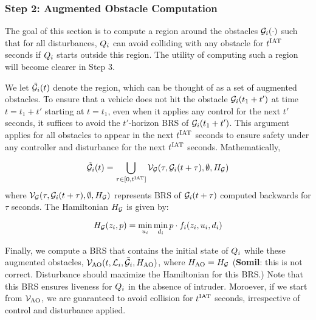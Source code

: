 \subsubsection{Step 2: Augmented Obstacle Computation \label{sec:intruder_aocomp}}
The goal of this section is to compute a region around the obstacles $\mathcal{G}_i(\cdot)$ such that for all disturbances, $Q_{i}$ can avoid colliding with any obstacle for $t^\text{IAT}$ seconds if $Q_{i}$ starts outside this region. The utility of computing such a region will become clearer in Step 3. 

We let $\tilde{\mathcal{G}}_i(t)$ denote the region, which can be thought of as a set of augmented obstacles. To ensure that a vehicle does not hit the obstacle $\mathcal{G}_i(t_1 + t')$ at time $t = t_1 + t'$ starting at $t = t_1$, even when it applies any control for the next $t'$ seconds, it suffices to avoid the $t'$-horizon BRS of $\mathcal{G}_i(t_1 + t')$. This argument applies for all obstacles to appear in the next $t^\text{IAT}$ seconds to ensure safety under any controller and disturbance for the next $t^\text{IAT}$ seconds. Mathematically,

\begin{equation} \label{eqn:inducedobs}
\tilde\obsset_i(t) = \bigcup_{\tau \in [0, \iat]} \brs_{\mathcal{G}}(\tau, \obsset_i(t+\tau), \emptyset, \ham_{\mathcal{G}})
\end{equation}
where $\mathcal{V}_{\mathcal{G}}(\tau, \mathcal{G}_i(t+\tau), \emptyset, H_{\mathcal{G}})$ represents BRS of $\mathcal{G}_i(t+\tau)$ computed backwards for $\tau$ seconds. The Hamiltonian 
$H_{\mathcal{G}}$ is given by:

\begin{equation} \label{eqn:BRSham}
\ham_{\mathcal{G}}(\state_i, p) = \min_{\ctrl_i} \min_{\dstb_i} p \cdot f_i (\state_i, \ctrl_i, \dstb_i)
\end{equation}

Finally, we compute a BRS that contains the initial state of $Q_{i}$ while these augmented obstacles, $\mathcal{V}_\text{AO}(t, \mathcal{L}_i, \bar{\mathcal{G}}_i, H_\text{AO})$, where $H_\text{AO} = H_{\mathcal{G}}$ (\textbf{Somil}: this is not correct. Disturbance should maximize the Hamiltonian for this BRS.) Note that this BRS ensures liveness for $Q_{i}$ in the absence of intruder. Moroever, if we start from $\mathcal{V}_\text{AO}$, we are guaranteed to avoid collision for $t^\text{IAT}$ seconds, irrespective of control and disturbance applied. 